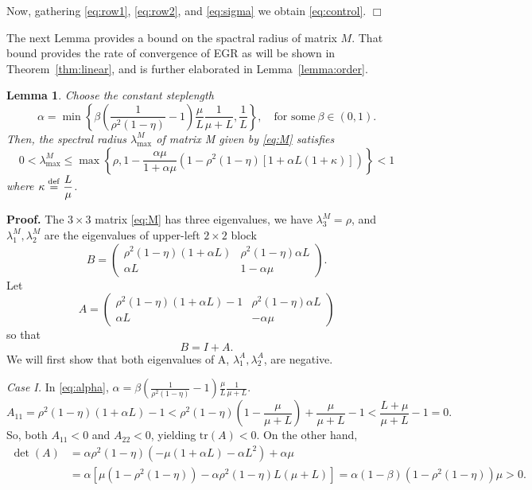 \documentclass[11pt]{article}
\newtheorem{lem}[thm]{Lemma}
\newcommand{\defeq}{\stackrel{\rm def}{=}}
\begin{document}
\bigskip\noindent
Now, gathering \eqref{eq:row1}, \eqref{eq:row2}, and \eqref{eq:sigma} we obtain \eqref{eq:control}. 
\hspace*{\fill}$\Box$\medskip



\bigskip


The next Lemma provides a bound on the spactral radius of matrix $M$.  That bound provides the rate of convergence of EGR as will be shown in Theorem~\ref{thm:linear}, and is further elaborated in Lemma~\ref{lemma:order}.

\begin{lem} \label{lemma:spectral}
 Choose the constant steplength
 \begin{equation}\label{eq:alpha}
    \alpha = \min\left\lbrace\beta\left(\frac{1}{\rho^2(1-\eta)}-1\right)\frac{\mu}{L}\frac{1}{\mu+L},\frac{1}{L}\right\rbrace, \quad \mbox{for some} \ \beta  \in(0,1).
 \end{equation}
 Then, the spectral radius $\lambda^M_{\max}$ of matrix M given by \eqref{eq:M} satisfies
 \begin{equation}\label{eq:spectral}
  0<\lambda^M_{\max} \leq \max\left\lbrace\rho, 1-\frac{\alpha\mu}{1+\alpha\mu}\left(1-\rho^2(1-\eta)[1+\alpha L(1+\kappa)]\right)\right\rbrace<1 
 \end{equation}
where $\kappa \defeq \displaystyle\frac{L}{\mu}$.
\end{lem}

\noindent 
\textbf{Proof.}  The $3\times 3$ matrix \eqref{eq:M} has three eigenvalues, we have $\lambda^M_3=\rho$, and $\lambda^M_1,\lambda^M_2$ are the eigenvalues of upper-left $2\times 2$ block
\begin{equation}\label{eq:M}
 B = \begin{pmatrix} \rho^2(1-\eta)(1+\alpha  L)  &    \rho^2(1-\eta)\alpha L \\  
                   \alpha L  & 1-\alpha \mu \end{pmatrix}.                    
\end{equation} 
Let 
\[
A = \begin{pmatrix} \rho^2(1-\eta)(1+\alpha  L)-1 & \rho^2(1-\eta)\alpha L\\  
                   \alpha L  & -\alpha\mu \end{pmatrix}  
\]
so that
\[
 B = I + A.
\]
We will first show that both eigenvalues of A, $\lambda^A_1,\lambda^A_2$, are negative.  

\bigskip

\textit{Case I.} In \eqref{eq:alpha}, $\alpha = \beta\left(\frac{1}{\rho^2(1-\eta)}-1\right)\frac{\mu}{L}\frac{1}{\mu+L}$. 
\[
A_{11} = \rho^2(1-\eta)(1+\alpha  L)-1 < \rho^2(1-\eta)\left(1-\frac{\mu}{\mu+L}\right)+\frac{\mu}{\mu+L}-1 < \frac{L+\mu}{\mu+L} -1 = 0.
\]
So, both $A_{11}<0$ and $A_{22}<0$, yielding $\mbox{tr}(A)<0$.  On the other hand, 
\begin{align*}
 \det(A) &= \alpha\rho^2(1-\eta)(-\mu(1+\alpha L)-\alpha L^2)+\alpha\mu\\
 &= \alpha \left[ \mu\left(1-\rho^2(1-\eta)\right) - \alpha \rho^2(1-\eta) L (\mu+L) \right] = \alpha(1-\beta)(1-\rho^2(1-\eta))\mu >0.
\end{align*}
\end{document}
